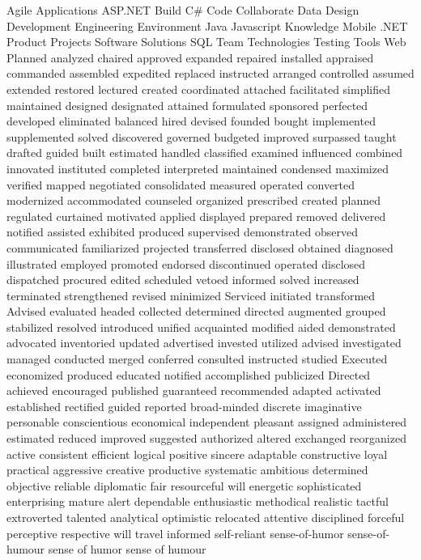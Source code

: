\documentclass[]{friggeri-cv} %
\begin{document}
\keyword
{
Agile
Applications
ASP.NET
Build
C\#
Code
Collaborate
Data
Design
Development
Engineering
Environment
Java
Javascript
Knowledge
Mobile
.NET
Product
Projects
Software
Solutions
SQL
Team
Technologies
Testing
Tools
Web
Planned
analyzed
chaired
approved
expanded
repaired
installed
appraised
commanded
assembled
expedited
replaced
instructed
arranged
controlled
assumed
extended
restored
lectured
created
coordinated
attached
facilitated
simplified
maintained
designed
designated
attained
formulated
sponsored
perfected
developed
eliminated
balanced
hired
devised
founded
bought
implemented
supplemented
solved
discovered
governed
budgeted
improved
surpassed
taught
drafted
guided
built
estimated
handled
classified
examined
influenced
combined
innovated
instituted
completed
interpreted
maintained
condensed
maximized
verified
mapped
negotiated
consolidated
measured
operated
converted
modernized
accommodated
counseled
organized
prescribed
created
planned
regulated
curtained
motivated
applied
displayed
prepared
removed
delivered
notified
assisted
exhibited
produced
supervised
demonstrated
observed
communicated
familiarized
projected
transferred
disclosed
obtained
diagnosed
illustrated
employed
promoted
endorsed
discontinued
operated
disclosed
dispatched
procured
edited
scheduled
vetoed
informed
solved
increased
terminated
strengthened
revised
minimized
Serviced
initiated
transformed
Advised
evaluated
headed
collected
determined
directed
augmented
grouped
stabilized
resolved
introduced
unified
acquainted
modified
aided
demonstrated
advocated
inventoried
updated
advertised
invested
utilized
advised
investigated
managed
conducted
merged
conferred
consulted
instructed
studied
Executed
economized
produced
educated
notified
accomplished
publicized
Directed
achieved
encouraged
published
guaranteed
recommended
adapted
activated
established
rectified
guided
reported
broad-minded
discrete
imaginative
personable
conscientious
economical
independent
pleasant
assigned
administered
estimated
reduced
improved
suggested
authorized
altered
exchanged
reorganized
active
consistent
efficient
logical
positive
sincere
adaptable
constructive
loyal
practical
aggressive
creative
productive
systematic
ambitious
determined
objective
reliable
diplomatic
fair
resourceful
will
energetic
sophisticated
enterprising
mature
alert
dependable
enthusiastic
methodical
realistic
tactful
extroverted
talented
analytical
optimistic
relocated
attentive
disciplined
forceful
perceptive
respective
will
travel
informed
self-reliant
sense-of-humor
sense-of-humour
sense of humor
sense of humour
}

\newpage
\end{document}
